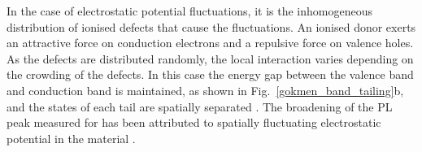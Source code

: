 \documentclass[11pt, twoside]{report}
\begin{document}

In the case of electrostatic potential fluctuations, it is the inhomogeneous distribution of ionised defects that cause the fluctuations. An ionised donor exerts an attractive force on conduction electrons and a repulsive force on valence holes. As the defects are distributed randomly, the local interaction varies depending on the crowding of the defects. In this case the energy gap between the valence band and conduction band is maintained, as shown in Fig.~\ref{gokmen_band_tailing}b, and the states of each tail are spatially separated \cite{Pankove}. The broadening of the PL peak measured for {\CZTS} has been attributed to spatially fluctuating electrostatic potential in the material \cite{CZTS_TEM}.



\end{document}
